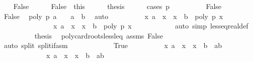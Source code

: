 \begin{isabellebody}
\ \ \isamarkupfalse%
\ False\isanewline
\ \ \ \ \isamarkupfalse%
\ False{\isacharprime}\ {\isacharequal}\ this\isanewline
\ \ \ \ \isamarkupfalse%
\ {\isacharquery}thesis\isanewline
\ \ \ \ \isamarkupfalse%
\ {\isacharparenleft}cases\ {\isachardoublequoteopen}p\ {\isacharequal}\ {}{\isachardoublequoteclose}{\isacharparenright}\isanewline
\ \ \ \ \ \ \isamarkupfalse%
\ False\isanewline
\ \ \ \ \ \ \ \ \isamarkupfalse%
\ False{\isacharprime}\ \isamarkupfalse%
\ {\isachardoublequoteopen}poly\ p\ a\ {\isasymnoteq}\ {}\ {\isasymor}\ a\ {\isachargreater}\ b{\isachardoublequoteclose}\ \isamarkupfalse%
\ auto\isanewline
\ \ \ \ \ \ \ \ \isamarkupfalse%
\ {\isachardoublequoteopen}{\isacharbraceleft}x{\isachardot}\ a\ {\isasymle}\ x\ {\isasymand}\ x\ {\isasymle}\ b\ {\isasymand}\ poly\ p\ x\ {\isacharequal}\ {}{\isacharbraceright}\ {\isacharequal}\ \isanewline
\ \ \ \ \ \ \ \ \ \ \ \ \ \ \ {\isacharbraceleft}x{\isachardot}\ a\ {\isacharless}\ x\ {\isasymand}\ x\ {\isasymle}\ b\ {\isasymand}\ poly\ p\ x\ {\isacharequal}\ {}{\isacharbraceright}{\isachardoublequoteclose}\isanewline
\ \ \ \ \ \ \ \ \isamarkupfalse%
\ {\isacharparenleft}auto\ simp{\isacharcolon}\ less{\isacharunderscore}eq{\isacharunderscore}real{\isacharunderscore}def{\isacharparenright}\isanewline
\ \ \ \ \ \ \ \ \isamarkupfalse%
\ {\isacharquery}thesis\ \isamarkupfalse%
\ poly{\isacharunderscore}card{\isacharunderscore}roots{\isacharunderscore}less{\isacharunderscore}leq\ assms\ False{\isacharprime}\ \isanewline
\ \ \ \ \ \ \ \ \ \ \ \ \isamarkupfalse%
\ {\isacharparenleft}auto\ split{\isacharcolon}\ split{\isacharunderscore}if{\isacharunderscore}asm{\isacharparenright}\isanewline
\ \ \ \ \isamarkupfalse%
\isanewline
\ \ \ \ \ \ \isamarkupfalse%
\ True\isanewline
\ \ \ \ \ \ \ \ \isamarkupfalse%
\ {\isachardoublequoteopen}{\isacharbraceleft}x{\isachardot}\ a\ {\isasymle}\ x\ {\isasymand}\ x\ {\isasymle}\ b{\isacharbraceright}\ {\isacharequal}\ {\isacharbraceleft}a{\isachardot}{\isachardot}b{\isacharbraceright}{\isachardoublequoteclose}\isanewline
\ \ \ \ \ \ \ \ \ \ \ \ \ {\isachardoublequoteopen}{\isacharbraceleft}x{\isachardot}\ a\ {\isacharless}\ x\ {\isasymand}\ x\ {\isasymle}\ b{\isacharbraceright}\ {\isacharequal}\ {\isacharbraceleft}a{\isacharless}{\isachardot}{\isachardot}b{\isacharbraceright}{\isachardoublequoteclose}\ \isamarkupfalse%

\end{isabellebody}
